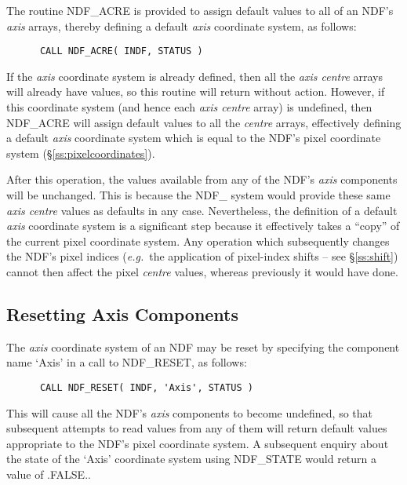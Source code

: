 \documentclass[twoside,11pt]{article}
\newcommand{\htmlref}[2]{#1}
\newcommand{\xlabel}[1]{}
\newcommand{\st}[1]{{\em{#1}}}
\begin{document}
The routine \htmlref{NDF\_ACRE}{NDF_ACRE} is provided to assign default values to all of an
NDF's \st{axis\/} arrays, thereby defining a default \st{axis\/}
coordinate system, as follows: 

\small
\begin{verbatim}
      CALL NDF_ACRE( INDF, STATUS )
\end{verbatim}
\normalsize

If the \st{axis\/} coordinate system is already defined, then all the
\st{axis centre\/} arrays will already have values, so this routine
will return 
without action. 
However, if this coordinate system (and hence each \st{axis centre\/}
array) is undefined, then NDF\_ACRE will assign default values to all the
\st{centre\/} arrays, effectively defining a default \st{axis\/}
coordinate system which is equal to the NDF's pixel coordinate system
(\S\ref{ss:pixelcoordinates}). 

After this operation, the values available from any of the NDF's
\st{axis\/} components will be unchanged. 
This is because the NDF\_ system would provide these same \st{axis
centre\/} values as defaults in any case. 
Nevertheless, the definition of a default \st{axis\/} coordinate system is
a significant step because it effectively takes a ``copy'' of the current
pixel coordinate system. 
Any operation which subsequently changes the NDF's pixel indices
(\st{e.g.}\ the application of pixel-index shifts -- see
\S\ref{ss:shift}) cannot 
then affect the pixel \st{centre\/} values, whereas previously it would
have done. 

\subsection{\xlabel{resetting_axis_components}Resetting Axis Components}

The \st{axis\/} coordinate system of an NDF may be reset by specifying the
component name `Axis' in a call to \htmlref{NDF\_RESET}{NDF_RESET}, as follows: 

\small
\begin{verbatim}
      CALL NDF_RESET( INDF, 'Axis', STATUS )
\end{verbatim}
\normalsize

This will cause all the NDF's \st{axis\/} components to become undefined,
so that subsequent attempts to read values from any of them will return
default values appropriate to the NDF's pixel coordinate system. 
A subsequent enquiry about the state of the `Axis' coordinate system using
\htmlref{NDF\_STATE}{NDF_STATE} would return a value of .FALSE.. 
\end{document}
